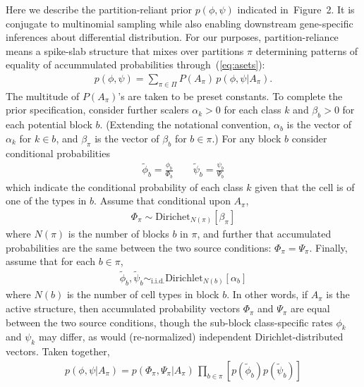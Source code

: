 \documentclass[11pt]{amsart}
\begin{document}
Here we describe the partition-reliant prior $p(\phi,\psi)$ indicated in~Figure~2.  It is conjugate to multinomial
sampling while also enabling downstream gene-specific inferences about
differential distribution.  
For our purposes, partition-reliance means a spike-slab structure that mixes
over partitions $\pi$ determining
 patterns of equality of accummulated probabilities through~(\ref{eq:asets}):
\begin{eqnarray*}
p(\phi,\psi) = \sum_{\pi \in \Pi} P(A_\pi) \, p(\phi,\psi| A_\pi ).
\end{eqnarray*} 
The multitude of $P(A_\pi)$'s are taken to be preset constants. 
To complete the prior specification, consider further scalers
$\alpha_k>0$ for each class $k$ and $\beta_b>0$ for each potential block $b$.
(Extending the notational convention, $\alpha_b$ is the vector of $\alpha_k$
for $k\in b$, and $\beta_\pi$ is the vector of $\beta_b$ for $b \in \pi$.)
For any block $b$ consider conditional probabilities
\begin{eqnarray*}
\tilde{\phi}_b = \frac{\phi_b}{\Phi_b} \qquad \tilde{\psi}_b = \frac{\psi_b}{\Psi_b}
\end{eqnarray*}
which indicate the conditional probability of each class $k$ given that
the cell is of one of the types in $b$.  Assume that conditional upon 
$A_\pi$,
\begin{eqnarray*}
\Phi_\pi \sim \text{Dirichet}_{N(\pi)}[   \beta_\pi   ]
\end{eqnarray*}
where $N(\pi)$ is the number of blocks $b$ in $\pi$,
and further that accumulated probabilities are the same between
the two source conditions: $\Phi_\pi = \Psi_\pi$.
Finally, assume that for each $b \in \pi$,
\begin{eqnarray*}
\tilde \phi_b, \tilde \psi_b \sim_{\text{i.i.d.}}
  \text{Dirichlet}_{N(b)}[ \alpha_b ]
\end{eqnarray*}
where $N(b)$ is the number of cell types in block $b$.
In other words, if $A_\pi$ is the active structure, then
accumulated probability vectors $\Phi_\pi$ and $\Psi_\pi$ are equal
between the two source conditions, though the sub-block class-specific
rates $\phi_k$ and $\psi_k$ may differ, as would (re-normalized)
independent Dirichlet-distributed vectors.
Taken together,
\begin{eqnarray*}
p(\phi,\psi|A_\pi) =
         p( \Phi_\pi, \Psi_\pi | A_\pi ) \, \prod_{b \in \pi}  \left[
         p( \tilde \phi_b ) p( \tilde \psi_b ) \right]
\end{eqnarray*}
\end{document}
